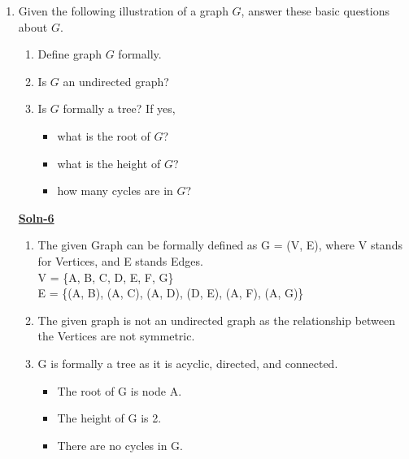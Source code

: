 \documentclass{article}
\begin{document}
\begin{enumerate}
\item   Given the following illustration of a graph $G$, answer these
        basic questions about $G$.
        \begin{center}\end{center}
        \begin{enumerate}
        \item   Define graph $G$ formally.
        \item   Is $G$ an undirected graph?
        \item   Is $G$ formally a tree?  If yes,
                \begin{itemize}
                \item   what is the root of $G$?
                \item   what is the height of $G$?
                \item   how many cycles are in $G$?
                \end{itemize}
        \end{enumerate}

        \textbf{\underline{Soln-6}} 
        \begin{enumerate}
            \item The given Graph can be formally defined as G = (V, E), where V stands for Vertices, and E stands Edges. \\
                V = \{A, B, C, D, E, F, G\} \\
                E = \{(A, B), (A, C), (A, D), (D, E), (A, F), (A, G)\}
            \item The given graph is not an undirected graph as the relationship between the Vertices are not symmetric. 
            \item G is formally a tree as it is acyclic, directed, and connected.
            \begin{itemize}
                \item The root of G is node A.
                \item The height of G is 2.
                \item There are no cycles in G.
            \end{itemize}
        \end{enumerate}


\end{enumerate}
\end{document}
